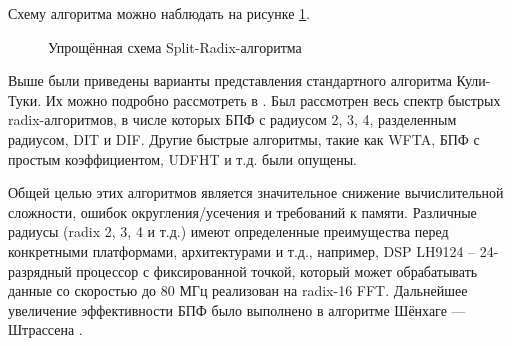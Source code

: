 Схему алгоритма можно наблюдать на рисунке \ref{figure: split-radix}.
\begin{figure}
\centering
{}
\caption{Упрощённая схема Split-Radix-алгоритма}
\label{figure: split-radix}
\end{figure}

Выше были приведены варианты представления стандартного алгоритма Кули-Туки.
Их можно подробно рассмотреть в \cite{CT-FFT, NTT-using-cyclotomic-polynomials}.
Был рассмотрен весь спектр быстрых radix-алгоритмов, в числе которых БПФ с радиусом 2, 3, 4, разделенным радиусом, DIT и DIF.
Другие быстрые алгоритмы, такие как WFTA, БПФ с простым коэффициентом, UDFHT и т.д. были опущены.

Общей целью этих алгоритмов является значительное снижение вычислительной сложности, ошибок округления/усечения и требований к памяти.
Различные радиусы (radix 2, 3, 4 и т.д.) имеют определенные преимущества перед конкретными платформами, архитектурами и т.д., например, DSP LH9124 – 24-разрядный процессор с фиксированной точкой, который может обрабатывать данные со скоростью до 80 МГц реализован на radix-16 FFT.
Дальнейшее увеличение эффективности БПФ было выполнено в алгоритме Шёнхаге — Штрассена \cite{Schonhage}.


